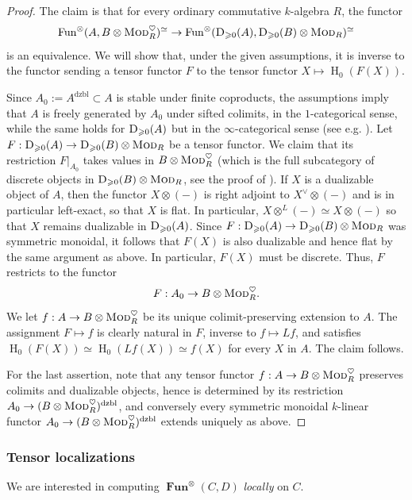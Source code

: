 \documentclass[12pt, oneside]{amsart}
\numberwithin{equation}{section}
\theoremstyle{remark}
\theoremstyle{plain}
\renewcommand{\geq}{\geqslant}
\newcommand{\DD}{\textsc{D}}
\newcommand{\Mod}{\textsc{Mod}}
\newcommand{\TensFun}{\operatorname{Fun}^{\otimes}}
\newcommand{\TENSFUN}{\operatorname{\mathbf{Fun}}^{\otimes}}
\begin{document}
\begin{proof} The claim is that for every ordinary commutative $k$-algebra $R$, the functor
\[ \TensFun(A, B \otimes \Mod^\heartsuit_R)^\simeq \to \TensFun(\DD_{\geq 0}(A), \DD_{\geq 0}(B) \otimes \Mod_R)^\simeq \]
is an equivalence. We will show that, under the given assumptions, it is inverse to the functor sending a tensor functor $F$ to the tensor functor $X \mapsto \operatorname{H}_0(F(X))$.

Since $A_0 := A^{\mathrm{dzbl}} \subset A$ is stable under finite coproducts, the assumptions imply that $A$ is freely generated by $A_0$ under sifted colimits, in the $1$-categorical sense, while the same holds for $\DD_{\geq 0}(A)$ but in the $\infty$-categorical sense (see e.g. \cite[\S 5.1]{CesScholze}).
Let $F : \DD_{\geq 0}(A) \to \DD_{\geq 0}(B) \otimes \Mod_R$ be a tensor functor. We claim that its restriction $F|_{A_0}$ takes values in $B \otimes \Mod^\heartsuit_R$ (which is the full subcategory of discrete objects in $\DD_{\geq 0}(B) \otimes \Mod_R$, see the proof of \cite[Thm.~C.5.4.16]{SAG}). If $X$ is a dualizable object of $A$, then the functor $X \otimes (-)$ is right adjoint to $X^\vee \otimes (-)$ and is in particular left-exact, so that $X$ is flat. In particular, $X \otimes^L (-) \simeq X \otimes (-)$ so that $X$ remains dualizable in $\DD_{\geq 0}(A)$. Since $F : \DD_{\geq 0}(A) \to \DD_{\geq 0}(B) \otimes \Mod_R$ was symmetric monoidal, it follows that $F(X)$ is also dualizable and hence flat by the same argument as above. In particular, $F(X)$ must be discrete. Thus, $F$ restricts to the functor
\[ F : A_0 \to B \otimes \Mod^\heartsuit_R. \]
We let $f : A \to B \otimes \Mod^\heartsuit_R$ be its unique colimit-preserving extension to $A$. The assignment $F \mapsto f$ is clearly natural in $F$, inverse to $f \mapsto Lf$, and satisfies $\operatorname{H}_0 (F(X)) \simeq \operatorname{H}_0 (Lf(X)) \simeq f(X)$ for every $X$ in $A$. The claim follows.

For the last assertion, note that any tensor functor $f : A \to B \otimes \Mod^\heartsuit_R$ preserves colimits and dualizable objects, hence is determined by its restriction $A_0 \to (B \otimes \Mod^\heartsuit_R)^{\mathrm{dzbl}}$, and conversely every symmetric monoidal $k$-linear functor $A_0 \to (B \otimes \Mod^\heartsuit_R)^{\mathrm{dzbl}}$ extends uniquely as above. \end{proof}

\subsubsection{Tensor localizations} We are interested in computing $\TENSFUN(C,D)$ \emph{locally} on $C$.
\end{document}
